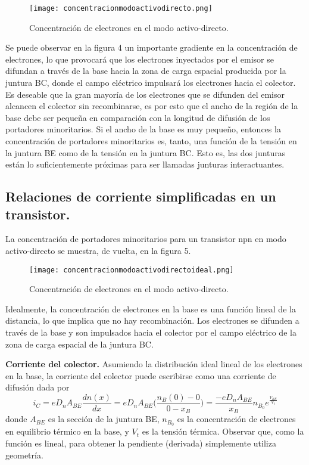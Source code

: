 \documentclass[12pt,a4paper]{article}
\begin{document}
\begin{figure}[ht!]
\begin{center}
\texttt{[image: concentracionmodoactivodirecto.png]}
\caption{Concentración de electrones en el modo activo-directo.}
\end{center}
\end{figure}

Se puede observar en la figura 4 un importante gradiente en la concentración de electrones, lo que provocará que los electrones inyectados por el emisor se difundan a través de la base hacia la zona de carga espacial producida por la juntura BC, donde el campo eléctrico impulsará los electrones hacia el colector. Es deseable que la gran mayoría de los electrones que se difunden del emisor alcancen el colector sin recombinarse, es por esto que el ancho de la región de la base debe ser pequeña en comparación con la longitud de difusión de los portadores minoritarios. Si el ancho de la base es muy pequeño, entonces la concentración de portadores minoritarios es, tanto, una función de la tensión en la juntura BE como de la tensión en la juntura BC. Esto es, las dos junturas están lo suficientemente próximas para ser llamadas junturas interactuantes.

\subsection{Relaciones de corriente simplificadas en un transistor.}

La concentración de portadores minoritarios para un transistor npn en modo activo-directo se muestra, de vuelta, en la figura 5.

\begin{figure}[ht!]
\begin{center}
\texttt{[image: concentracionmodoactivodirectoideal.png]}
\caption{Concentración de electrones en el modo activo-directo.}
\end{center}
\end{figure}

Idealmente, la concentración de electrones en la base es una función lineal de la distancia, lo que implica que no hay recombinación. Los electrones se difunden a través de la base y son impulsados hacia el colector por el campo eléctrico de la zona de carga espacial de la juntura BC.

\textbf{Corriente del colector.} Asumiendo la distribución ideal lineal de los electrones en la base, la corriente del colector puede escribirse como una corriente de difusión dada por
\[ i_{C}=eD_{n}A_{BE}\frac{dn(x)}{dx}=eD_{n}A_{BE}\bigg( \frac{n_{B}(0)-0}{0-x_{B}} \bigg)= \frac{-eD_{n}A_{BE}}{x_{B}} n_{B_{0}} e^{\frac{V_{BE}}{V_{t}}}\]
donde $A_{BE}$ es la sección de la juntura BE, $n_{B_{0}}$ es la concentración de electrones en equilibrio térmico en la base, y $V_{t}$ es la tensión térmica. Observar que, como la función es lineal, para obtener la pendiente (derivada) simplemente utiliza geometría.
\end{document}
